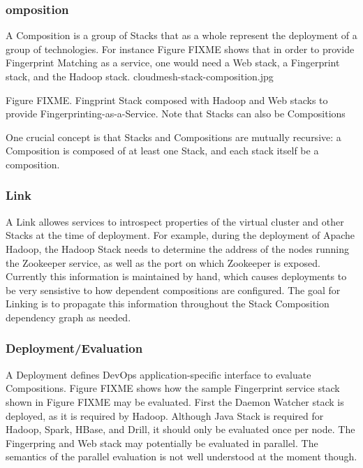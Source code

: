 \documentclass[9pt,twocolumn,twoside]{styles/osajnl}
\begin{document}
\subsubsection{omposition}

A Composition is a group of Stacks that as a whole represent the deployment of a group of technologies. For instance Figure FIXME shows that in order to provide Fingerprint Matching as a service, one would need a Web stack, a Fingerprint stack, and the Hadoop stack.
 cloudmesh-stack-composition.jpg 

Figure FIXME. Fingprint Stack composed with Hadoop and Web stacks to
provide Fingerprinting-as-a-Service. Note that Stacks can also be Compositions


One crucial concept is that Stacks and Compositions are mutually recursive: a Composition is composed of at least one Stack, and each stack itself be a composition.


\subsubsection{Link}

A Link allowes services to introspect properties of the virtual cluster and other Stacks at the time of deployment. For example, during the deployment of Apache Hadoop, the Hadoop Stack needs to determine the address of the nodes running the Zookeeper service, as well as the port on which Zookeeper is exposed. Currently this information is maintained by hand, which causes deployments to be very sensistive to how dependent compositions are configured. The goal for Linking is to propagate this information throughout the Stack Composition dependency graph as needed.


\subsubsection{Deployment/Evaluation}

A Deployment defines DevOps application-specific interface to evaluate Compositions.
Figure FIXME shows how the sample Fingerprint service stack shown in Figure FIXME may be evaluated. First the Daemon Watcher stack is deployed, as it is required by Hadoop. Although Java Stack is required for Hadoop, Spark, HBase, and Drill, it should only be evaluated once per node. The Fingerpring and Web stack may potentially be evaluated in parallel. The semantics of the parallel evaluation is not well understood at the moment though.
\end{document}
